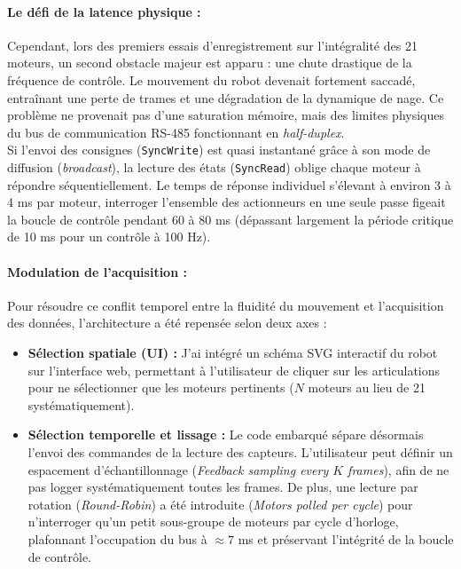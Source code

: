 \documentclass{tropLaClasse}
\begin{document}
\paragraph{Le défi de la latence physique :}
Cependant, lors des premiers essais d'enregistrement sur l'intégralité des 21 moteurs, un second obstacle majeur est apparu : une chute drastique de la fréquence de contrôle. Le mouvement du robot devenait fortement saccadé, entraînant une perte de trames et une dégradation de la dynamique de nage. Ce problème ne provenait pas d'une saturation mémoire, mais des limites physiques du bus de communication RS-485 fonctionnant en \textit{half-duplex}.\\

Si l'envoi des consignes (\texttt{SyncWrite}) est quasi instantané grâce à son mode de diffusion (\textit{broadcast}), la lecture des états (\texttt{SyncRead}) oblige chaque moteur à répondre séquentiellement. Le temps de réponse individuel s'élevant à environ 3 à 4 ms par moteur, interroger l'ensemble des actionneurs en une seule passe figeait la boucle de contrôle pendant 60 à 80 ms (dépassant largement la période critique de 10 ms pour un contrôle à 100 Hz).

\paragraph{Modulation de l'acquisition :}
Pour résoudre ce conflit temporel entre la fluidité du mouvement et l'acquisition des données, l'architecture a été repensée selon deux axes :
\begin{itemize}
    \item \textbf{Sélection spatiale (UI) :} J'ai intégré un schéma SVG interactif du robot sur l'interface web, permettant à l'utilisateur de cliquer sur les articulations pour ne sélectionner que les moteurs pertinents ($N$ moteurs au lieu de 21 systématiquement).
    \item \textbf{Sélection temporelle et lissage :} Le code embarqué sépare désormais l'envoi des commandes de la lecture des capteurs. L'utilisateur peut définir un espacement d'échantillonnage (\textit{Feedback sampling every $K$ frames}), afin de ne pas logger systématiquement toutes les frames. De plus, une lecture par rotation (\textit{Round-Robin}) a été introduite (\textit{Motors polled per cycle}) pour n'interroger qu'un petit sous-groupe de moteurs par cycle d'horloge, plafonnant l'occupation du bus à $\approx 7$ ms et préservant l'intégrité de la boucle de contrôle.
\end{itemize}
\end{document}
